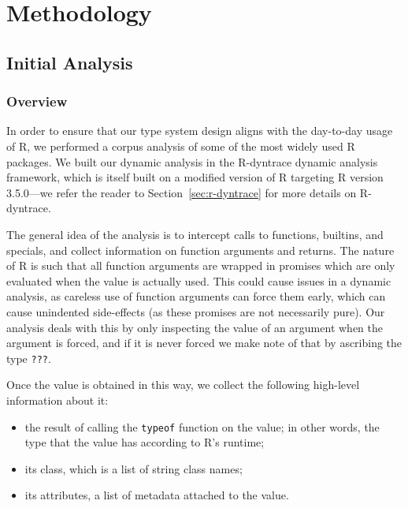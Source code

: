 \documentclass[acmsmall,review,anonymous]{acmart}\settopmatter{printfolios=true,printccs=false,printacmref=false}
\begin{document}

%
%
%
%
%
%
\section{Methodology}

%
%
%
%
\subsection{Initial Analysis}

%
%
\subsubsection{Overview}

In order to ensure that our type system design aligns with the day-to-day usage of R, we performed a corpus analysis of some of the most widely used R packages.
We built our dynamic analysis in the R-dyntrace  dynamic analysis framework, which is itself built on a modified version of R targeting R version 3.5.0---we refer the reader to Section~\ref{sec:r-dyntrace} for more details on R-dyntrace.

The general idea of the analysis is to intercept calls to functions, builtins, and specials, and collect information on function arguments and returns.
The nature of R is such that all function arguments are wrapped in promises which are only evaluated when the value is actually used.
This could cause issues in a dynamic analysis, as careless use of function arguments can force them early, which can cause unindented side-effects (as these promises are not necessarily pure).
Our analysis deals with this by only inspecting the value of an argument when the argument is forced, and if it is never forced we make note of that by ascribing the type {\tt ???}.


Once the value is obtained in this way, we collect the following high-level information about it:

\begin{itemize}
\item the result of calling the {\tt typeof} function on the value; in other words, the type that the value has according to R's runtime;
\item its class, which is a list of string class names;
\item its attributes, a list of metadata attached to the value.
\end{itemize}
\end{document}
